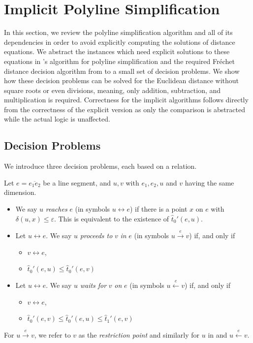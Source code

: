 \section{Implicit Polyline Simplification}\label{sec:implicit_polyline_simplification} 
In this section, we review the polyline simplification algorithm and all of its dependencies in order to avoid explicitly computing the solutions of distance equations. We abstract the instances which need explicit solutions to these equations in \citeauthor{on_optimal_polyline_simplification_using_the_hausdorff_and_frechet_distance}'s algorithm for polyline simplification and the required Fréchet distance decision algorithm from \citeauthor{computing_the_frechet_distance_between_two_polygonal_curves} to a small set of decision problems. 
We show how these decision problems can be solved for the Euclidean distance without square roots or even divisions, meaning, only addition, subtraction, and multiplication is required. Correctness for the implicit algorithms follows directly from the correctness of the explicit version as only the comparison is abstracted while the actual logic is unaffected. 

\subsection{Decision Problems}
We introduce three decision problems, each based on a relation. 
\begin{definition}\label{def:implicit_relations}
  Let \(e = \overline{e_1e_2}\) be a line segment, and \(u, v\) with \(e_1, e_2, u\) and \(v\) having the same dimension. 
  \begin{itemize}
    \item We say \(u\) \emph{reaches} \(e\) (in symbols \(u \leftrightarrow e\)) if there is a point \(x\) on \(e\) with \(\delta(u,x)\leq \varepsilon\). This is equivalent to the existence of \(\hat t_0'(e, u)\).
    \item Let \(u \leftrightarrow e\). We say \(u\) \emph{proceeds to} \(v\) \emph{in} \(e\) (in symbols \(u \overset{e}\rightarrow v\)) if, and only if 
      \begin{itemize}
        \item \(v \leftrightarrow e\), 
        \item \(\hat t_0'(e, u) \leq \hat t_0'(e, v)\)
      \end{itemize}

    \item Let \(u \leftrightarrow e\). We say \(u\) \emph{waits for} \(v\) \emph{on} \(e\) (in symbols \(u \overset{e}\leftarrow v\)) if, and only if
      \begin{itemize}
        \item \(v \leftrightarrow e\), 
        \item \(\hat t_0'(e, v) \leq \hat t_0'(e, u) \leq \hat t_1'(e, v)\)
      \end{itemize}
  \end{itemize}
  For \(u \overset e\rightarrow v\), we refer to \(v\) as the \emph{restriction point} and similarly for \(u\) in and \(u \overset e\leftarrow v\).
\end{definition}

